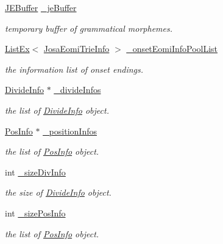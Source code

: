 \begin{CompactItemize}
\hyperlink{classkmaOrange_1_1JEBuffer}{JEBuffer} \hyperlink{classkmaOrange_1_1Dictionary_5de2ba7c4ee80c48f7d060a4d4fdff78}{\_\-jeBuffer}
\begin{CompactList}\small\item\em temporary buffer of grammatical morphemes. \item\end{CompactList}\item 
\hyperlink{classListEx}{ListEx}$<$ \hyperlink{classJosaEomiTrieInfo}{JosaEomiTrieInfo} $>$ \hyperlink{classkmaOrange_1_1Dictionary_0fe6a0d5defdbc12929e04f699e453e3}{\_\-onsetEomiInfoPoolList}
\begin{CompactList}\small\item\em the information list of onset endings. \item\end{CompactList}\item 
\hyperlink{classDivideInfo}{DivideInfo} $\ast$ \hyperlink{classkmaOrange_1_1Dictionary_eebf34672a311605acc6354875282b0b}{\_\-divideInfos}
\begin{CompactList}\small\item\em the list of \hyperlink{classDivideInfo}{DivideInfo} object. \item\end{CompactList}\item 
\hyperlink{classPosInfo}{PosInfo} $\ast$ \hyperlink{classkmaOrange_1_1Dictionary_b0750343ed81ceb58888a3576f98d174}{\_\-positionInfos}
\begin{CompactList}\small\item\em the list of \hyperlink{classPosInfo}{PosInfo} object. \item\end{CompactList}\item 
int \hyperlink{classkmaOrange_1_1Dictionary_dd2dc5534bc25b629ad4f99433afbbe5}{\_\-sizeDivInfo}
\begin{CompactList}\small\item\em the size of \hyperlink{classDivideInfo}{DivideInfo} object. \item\end{CompactList}\item 
int \hyperlink{classkmaOrange_1_1Dictionary_29cf18a61b8ae3d5d6122d0749ceb93f}{\_\-sizePosInfo}
\begin{CompactList}\small\item\em the list of \hyperlink{classPosInfo}{PosInfo} object. \item\end{CompactList}\item 

\end{CompactItemize}
